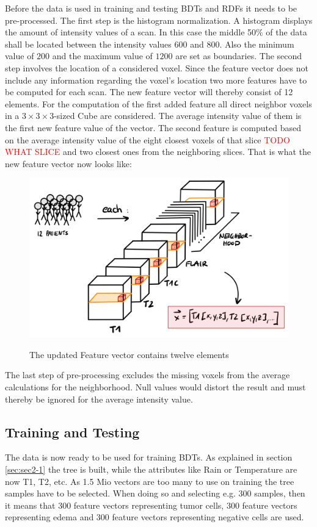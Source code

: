 \documentclass[
12pt,
headsepline,
bibliography=totoc,
twoside=semi,
fleqn
]{scrartcl}
\begin{document}
    Before the data is used in training and testing BDTs and RDFs it needs to be pre-processed. The first step is the histogram normalization. A histogram displays the amount of intensity values of a scan. In this case the middle 50$\%$ of the data shall be located between the intensity values $600$ and $800$. Also the minimum value of $200$ and the maximum value of $1200$ are set as boundaries. The second step involves the location of a considered voxel. Since the feature vector does not include any information regarding the voxel's location two more features have to be computed for each scan. The new feature vector will thereby consist of 12 elements. For the computation of the first added feature all direct neighbor voxels in a $3 \times 3 \times 3$-sized Cube are considered. The average intensity value of them is the first new feature value of the vector. The second feature is computed based on the average intensity value of the eight closest voxels of that slice \textcolor{red}{TODO WHAT SLICE} and two closest ones from the neighboring slices. That is what the new feature vector now looks like: 

    \begin{figure}[H]
      \centering \includegraphics[scale=0.7]{BDT15.png}\label{fig:fig15}
      \caption{The updated Feature vector contains twelve elements}
    \end{figure}

    The last step of pre-processing excludes the missing voxels from the average calculations for the neighborhood. Null values would distort the result and must thereby be ignored for the average intensity value. 

  \subsection{Training and Testing\label{sec:sec3-3}}
    The data is now ready to be used for training BDTs. As explained in section \ref{sec:sec2-1} the tree is built, while the attributes like Rain or Temperature are now T1, T2, etc. As 1.5 Mio vectors are too many to use on training the tree samples have to be selected. When doing so and selecting e.g. 300 samples, then it means that 300 feature vectors representing tumor cells, 300 feature vectors representing edema and 300 feature vectors representing negative cells are used. 
  
\end{document}

